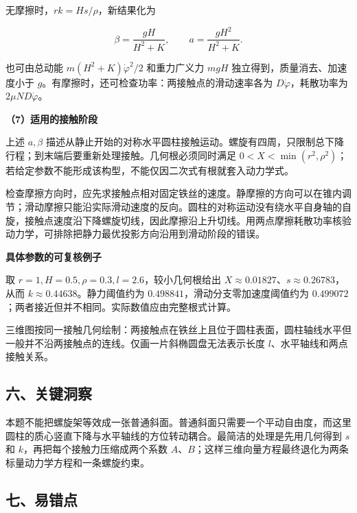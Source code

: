 \documentclass[12pt,a4paper,UTF8]{ctexart}
\begin{document}
无摩擦时，\(rk=Hs/\rho\)，新结果化为

\[\boxed{\beta=\frac{gH}{H^2+K},\qquad
 a=\frac{gH^2}{H^2+K}.}\]

也可由总动能 \(m(H^2+K)\dot\varphi^2/2\) 和重力广义力 \(mgH\)
独立得到，质量消去、加速度小于
\(g\)。有摩擦时，还可检查功率：两接触点的滑动速率各为
\(D\dot\varphi\)，耗散功率为 \(2\mu ND\dot\varphi\)。

\textbf{（7）适用的接触阶段}

上述 \(a,\beta\)
描述从静止开始的对称水平圆柱接触运动。螺旋有四周，只限制总下降行程；到末端后要重新处理接触。几何根必须同时满足
\(0<X<\min(r^2,\rho^2)\)；若给定参数不能形成该构型，不能仅因二次式有根就套入动力学式。

检查摩擦方向时，应先求接触点相对固定铁丝的速度。静摩擦的方向可以在锥内调节；滑动摩擦只能沿实际滑动速度的反向。圆柱的对称运动没有绕水平自身轴的自旋，接触点速度沿下降螺旋切线，因此摩擦沿上升切线。用两点摩擦耗散功率核验动力学，可排除把静力最优投影方向沿用到滑动阶段的错误。

\textbf{具体参数的可复核例子}

取 \(r=1,H=0.5,\rho=0.3,l=2.6\)，较小几何根给出
\(X\approx0.01827\)、\(s\approx0.26783\)，从而
\(k\approx0.44638\)。静力阈值约为 \(0.498841\)，滑动分支零加速度阈值约为
\(0.499072\)；两者接近但并不相同。实际数值应由完整根式计算。

三维图按同一接触几何绘制：两接触点在铁丝上且位于圆柱表面，圆柱轴线水平但一般并不沿两接触点的连线。仅画一片斜椭圆盘无法表示长度
\(l\)、水平轴线和两点接触关系。

\subsection{六、关键洞察}\label{ux516dux5173ux952eux6d1eux5bdf-5}

本题不能把螺旋架等效成一张普通斜面。普通斜面只需要一个平动自由度，而这里圆柱的质心竖直下降与水平轴线的方位转动耦合。最简洁的处理是先用几何得到
\(s\) 和 \(k\)，再把每个接触力压缩成两个系数
\(A\)、\(B\)；这样三维向量方程最终退化为两条标量动力学方程和一条螺旋约束。

\subsection{七、易错点}\label{ux4e03ux6613ux9519ux70b9-5}
\end{document}
